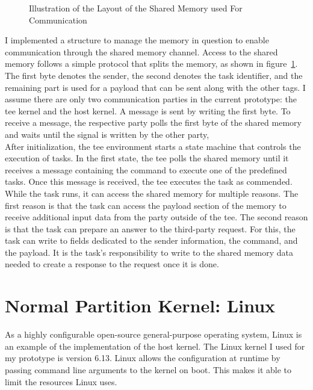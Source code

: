 \begin{center}
  \begin{figure}
    \centering
    
    \caption{Illustration of the Layout of the Shared Memory used For Communication}
    \label{fig:impl:shared_mem_layout}
  \end{figure}
\end{center}

I implemented a structure to manage the memory in question to enable
communication through the shared memory channel. Access to the shared memory
follows a simple protocol that splits the memory, as shown in
figure~\ref{fig:impl:shared_mem_layout}. The first byte denotes the sender, the
second denotes the task identifier, and the remaining part is used for a payload
that can be sent along with the other tags. I assume there are only two
communication parties in the current prototype: the \gls{tee} kernel and the
host kernel. A message is sent by writing the first byte. To receive a message,
the respective party polls the first byte of the shared memory and waits until
the signal is written by the other party, \\

After initialization, the \gls{tee} environment starts a state machine that
controls the execution of tasks. In the first state, the \gls{tee} polls the
shared memory until it receives a message containing the command to execute one
of the predefined tasks. Once this message is received, the \gls{tee} executes
the task as commended. While the task runs, it can access the shared memory for
multiple reasons. The first reason is that the task can access the payload
section of the memory to receive additional input data from the party outside of
the \gls{tee}. The second reason is that the task can prepare an answer to the
third-party request. For this, the task can write to fields dedicated to the
sender information, the command, and the payload. It is the task's
responsibility to write to the shared memory data needed to create a response to
the request once it is done.

\section{Normal Partition Kernel: Linux}
\label{sec:implementation:hostKernel}

As a highly configurable open-source general-purpose operating system, Linux is
an example of the implementation of the host kernel. The Linux kernel I used for
my prototype is version 6.13. Linux allows the configuration at runtime by
passing command line arguments to the kernel on boot. This makes it able to
limit the resources Linux uses. \\

